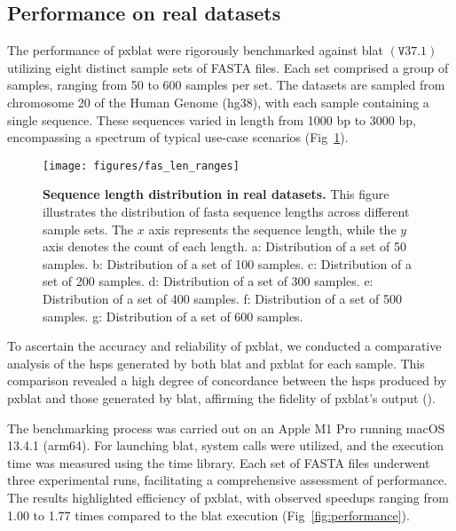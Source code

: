 \documentclass[10pt,letterpaper]{article}
\begin{document}
\subsection*{Performance on real datasets}

The performance of \gls{pxblat} were rigorously benchmarked against \gls{blat} \(\left(\mathtt{V}37.1\right)\) utilizing eight distinct sample sets of FASTA files.
Each set comprised a group of samples, ranging from 50 to 600 samples per set.
The datasets are sampled from chromosome 20 of the Human Genome (hg38), with each sample containing a single sequence.
These sequences varied in length from \num{1000} bp to \num{3000} bp, encompassing a spectrum of typical use-case scenarios (Fig~\ref{fig:fas_len}).

\begin{figure}[!h]
	\texttt{[image: figures/fas\_len\_ranges]}
	\caption{{\bf Sequence length distribution in real datasets.} This figure illustrates the distribution of fasta sequence lengths across different sample sets. The \(x\) axis represents the sequence length, while the \(y\) axis denotes the count of each length.
		a: Distribution of a set of \num{50} samples.
		b: Distribution of a set of \num{100} samples.
		c: Distribution of a set of \num{200} samples.
		d: Distribution of a set of \num{300} samples.
		e: Distribution of a set of \num{400} samples.
		f: Distribution of a set of \num{500} samples.
		g: Distribution of a set of \num{600} samples.
	}
	\label{fig:fas_len}
\end{figure}

To ascertain the accuracy and reliability of \gls{pxblat}, we conducted a comparative analysis of the \glspl{hsp} generated by both \gls{blat} and \gls{pxblat} for each sample.
This comparison revealed a high degree of concordance between the \glspl{hsp} produced by \gls{pxblat} and those generated by \gls{blat}, affirming the fidelity of \gls{pxblat}'s output ().

The benchmarking process was carried out on an Apple M1 Pro running macOS 13.4.1 (arm64).
For launching \gls{blat}, system calls were utilized, and the execution time was measured using the time library.
Each set of FASTA files underwent three experimental runs, facilitating a comprehensive assessment of performance.
The results highlighted efficiency of \gls{pxblat}, with observed speedups ranging from 1.00 to 1.77 times compared to the \gls{blat} execution (Fig~\ref{fig:performance}).
\end{document}
